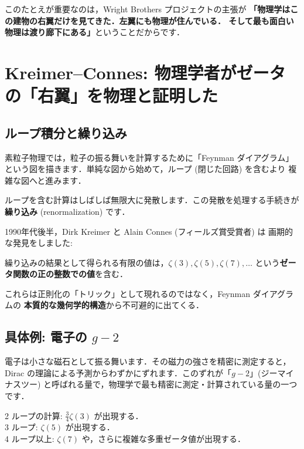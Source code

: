 \documentclass[11pt,a4paper]{article}
\begin{document}
このたとえが重要なのは，Wright Brothers プロジェクトの主張が
\textbf{「物理学はこの建物の右翼だけを見てきた．左翼にも物理が住んでいる．
そして最も面白い物理は渡り廊下にある」}ということだからです．

\section{Kreimer--Connes: 物理学者がゼータの「右翼」を物理と証明した}

\subsection{ループ積分と繰り込み}

素粒子物理では，粒子の振る舞いを計算するために「Feynman ダイアグラム」
という図を描きます．単純な図から始めて，ループ (閉じた回路) を含むより
複雑な図へと進みます．

ループを含む計算はしばしば無限大に発散します．この発散を処理する手続きが
\textbf{繰り込み} (renormalization) です．

1990年代後半，Dirk Kreimer と Alain Connes (フィールズ賞受賞者) は
画期的な発見をしました:

\begin{tcolorbox}[colback=green!5,colframe=green!50!black,title=Kreimer--Connes の発見]
繰り込みの結果として得られる有限の値は，$\zeta(3), \zeta(5), \zeta(7), \ldots$
という\textbf{ゼータ関数の正の整数での値}を含む．

これらは正則化の「トリック」として現れるのではなく，Feynman ダイアグラムの
\textbf{本質的な幾何学的構造}から不可避的に出てくる．
\end{tcolorbox}

\subsection{具体例: 電子の $g-2$}

電子は小さな磁石として振る舞います．その磁力の強さを精密に測定すると，
Dirac の理論による予測からわずかにずれます．このずれが「$g-2$」(ジーマイナスツー)
と呼ばれる量で，物理学で最も精密に測定・計算されている量の一つです．

2 ループの計算: $\frac{3}{4}\zeta(3)$ が出現する．\\
3 ループ: $\zeta(5)$ が出現する．\\
4 ループ以上: $\zeta(7)$ や，さらに複雑な多重ゼータ値が出現する．
\end{document}
